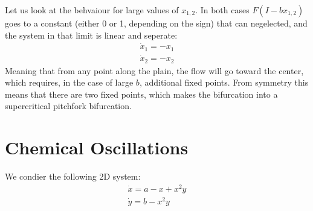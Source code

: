 \documentclass{article}
\begin{document}
\newline
Let us look at the behvaiour for large values of $x_{1,2}$. In both cases $F(I - bx_{1,2})$ goes to a constant (either 0 or 1, depending on the sign) that can negelected, and the system in that limit is linear and seperate:
\begin{equation}
\begin{gathered}
    \dot{x}_1 = -x_1 \\ \dot{x}_2 = -x_2
\end{gathered}
\end{equation}
Meaning that from any point along the plain, the flow will go toward the center, which requires, in the case of large $b$, additional fixed points. From symmetry this means that there are two fixed points, which makes the bifurcation into a supercritical pitchfork bifurcation.

\newpage
\section{Chemical Oscillations}
We condier the following 2D system:
\begin{equation}
\begin{gathered}
    \dot{x} = a - x + x^2y
    \\
    \dot{y} = b - x^2y
\end{gathered}
\end{equation}
\end{document}
